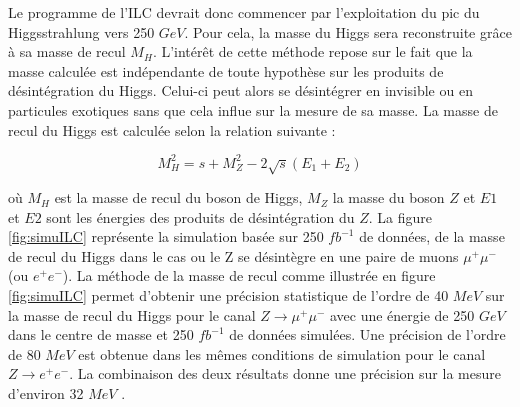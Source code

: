   
   Le programme de l'ILC devrait donc commencer par l'exploitation du pic du Higgsstrahlung vers 250 $GeV$. Pour cela, la masse du Higgs sera reconstruite grâce \`a sa masse de recul $M_H$. L'int\'er\^et de cette m\'ethode repose sur le fait que la masse calcul\'ee est ind\'ependante de toute hypoth\`ese sur les produits de d\'esint\'egration du Higgs. Celui-ci peut alors se d\'esint\'egrer en invisible ou en particules exotiques sans que cela influe sur la mesure de sa masse. La masse de recul du Higgs est calcul\'ee selon la relation suivante :
   
   \begin{equation}
    M_H^2 = s + M_Z^2 - 2 \sqrt{s}(E_1 + E_2)
   \end{equation}
 
   o\`u $M_H$ est la masse de recul du boson de Higgs, $M_Z$ la masse du boson $Z$ et $E1$ et $E2$ sont les \'energies des produits de d\'esint\'egration du $Z$. La figure \ref{fig:simuILC} repr\'esente la simulation bas\'ee sur 250 $fb^{-1}$ de donn\'ees, de la masse de recul du Higgs dans le cas ou le Z se d\'esint\`egre en une paire de muons $\mu^+ \mu^-$ (ou $e^+ e^-$). La m\'ethode de la masse de recul comme illustr\'ee en figure \ref{fig:simuILC} permet d'obtenir une pr\'ecision statistique de l'ordre de 40 $MeV$ sur la masse de recul du Higgs pour le canal $Z \rightarrow \mu^+ \mu^-$ avec une \'energie de 250 $GeV$ dans le centre de masse et 250 $fb^{-1}$ de donn\'ees simul\'ees. Une pr\'ecision de l'ordre de 80 $MeV$ est obtenue dans les m\^emes conditions de simulation pour le canal $Z \rightarrow e^+ e^-$. La combinaison des deux r\'esultats donne une pr\'ecision sur la mesure d'environ 32 $MeV$ \cite{Abe:2010aa} \cite{Li:2012taa}.
   
   \medskip
   
